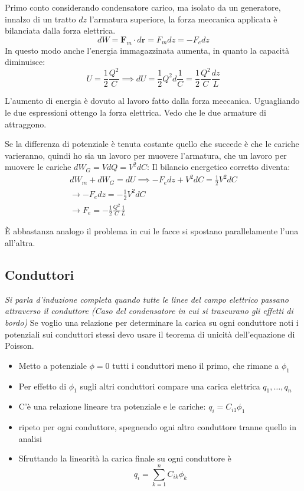 \documentclass[a4paper]{scrarticle}
\begin{document}
Primo conto considerando condensatore carico, ma isolato da un generatore, innalzo di un tratto $dz$ l'armatura superiore, la forza meccanica applicata è bilanciata dalla forza elettrica.
\begin{equation*}
    dW = \bm F_m \cdot d\bm r = F_m dz = - F_e dz
\end{equation*}
In questo modo anche l'energia immagazzinata aumenta, in quanto la capacità diminuisce:
\begin{equation*}
    U = \frac{1}{2}\frac{Q^2}{C} \implies dU = \frac{1}{2}Q^2 d \frac{1}{C} = \frac{1}{2}\frac{Q^2}{C}\frac{dz}{L}
\end{equation*}

L'aumento di energia è dovuto al lavoro fatto dalla forza meccanica. Uguagliando le due espressioni ottengo la forza elettrica.
Vedo che le due armature di attraggono.

Se la differenza di potenziale è tenuta costante quello che succede è che le cariche varieranno, quindi ho sia un lavoro per muovere l'armatura, che un lavoro per muovere le cariche $dW_G = VdQ = V^2 dC$:
Il bilancio energetico corretto diventa:
\begin{gather*}
    dW_m + dW_G = dU \implies -F_edz + V^2dC = \frac{1}{2}V^2dC\\
    \to -F_e dz = -\frac{1}{2}V^2dC\\
    \to F_e = -\frac{1}{2}\frac{Q^2}{C}\frac{1}{L}
\end{gather*}

È abbastanza analogo il problema in cui le facce si spostano parallelamente l'una all'altra.

\subsection{Conduttori}

\emph{Si parla d'induzione completa quando tutte le linee del campo elettrico passano attraverso il conduttore (Caso del condensatore in cui si trascurano gli effetti di bordo)}
Se voglio una relazione per determinare la carica su ogni conduttore noti i potenziali sui conduttori stessi devo usare il teorema di unicità dell'equazione di Poisson.

\begin{itemize}
    \item Metto a potenziale $ \phi = 0 $ tutti i conduttori meno il primo, che rimane a $\phi_1$
    \item Per effetto di $\phi_1$ sugli altri conduttori compare una carica elettrica $q_1, \dots, q_n$
    \item C'è una relazione lineare tra potenziale e le cariche: $q_i = C_{i1} \phi_1$
    \item ripeto per ogni conduttore, spegnendo ogni altro conduttore tranne quello in analisi
    \item Sfruttando la linearità la carica finale su ogni conduttore è 
    \begin{equation}
        q_i = \sum_{k=1}^{n}C_{ik} \phi_k
    \end{equation}
\end{itemize}
\end{document}
